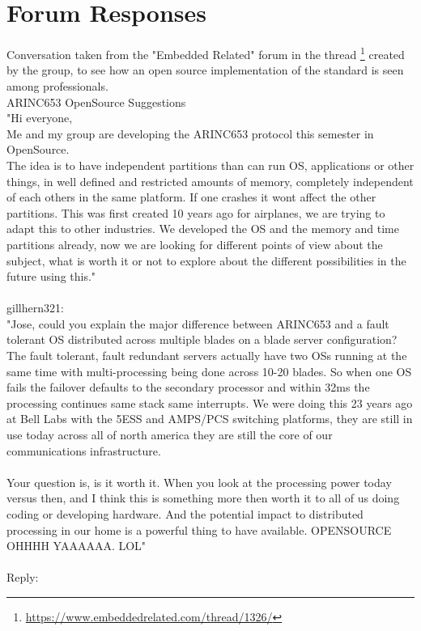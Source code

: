 \chapter{Forum Responses}
\label{chap:Forum Responses}

Conversation taken from the "Embedded Related" forum in the thread
\footnote{\url{https://www.embeddedrelated.com/thread/1326/}}
created by the group, to see how an open source implementation of the \arinc{}
standard is seen among professionals.\\


ARINC653 OpenSource Suggestions\\

"Hi everyone,\\

Me and my group are developing the ARINC653 protocol this semester in OpenSource.\\
The idea is to have independent partitions than can run OS, applications or other things, in well defined
and restricted amounts of memory, completely independent of each others in the same platform. If one
crashes it won\textquotesingle t affect the other partitions. This was first created 10 years ago for airplanes, we are
trying to adapt this to other industries. We developed the OS and the memory and time partitions already,
now we are looking for different points of view about the subject, what is worth it or not to explore
about the different possibilities in the future using this."\\
\\
gillhern321:\\

"Jose, could you explain the major difference between ARINC653 and a fault tolerant OS distributed across
multiple blades on a blade server configuration? The fault tolerant, fault redundant servers actually have
two OS\textquotesingle s running at the same time with multi-processing being done across 10-20 blades. So when one OS
fails the failover defaults to the secondary processor and within 32ms the processing continues same stack
same interrupts. We were doing this 23 years ago at Bell Labs with the 5ESS and AMPS/PCS switching
platforms, they are still in use today across all of north america they are still the core of our
communications infrastructure.\\
\\

Your question is, is it worth it. When you look at the processing power today versus then,  and I think
this is something more then worth it to all of us doing coding or developing hardware. And the potential
impact to distributed processing in our home is a powerful thing to have available.  OPENSOURCE     OHHHH
YAAAAAA. LOL"\\
\\
Reply:\\

